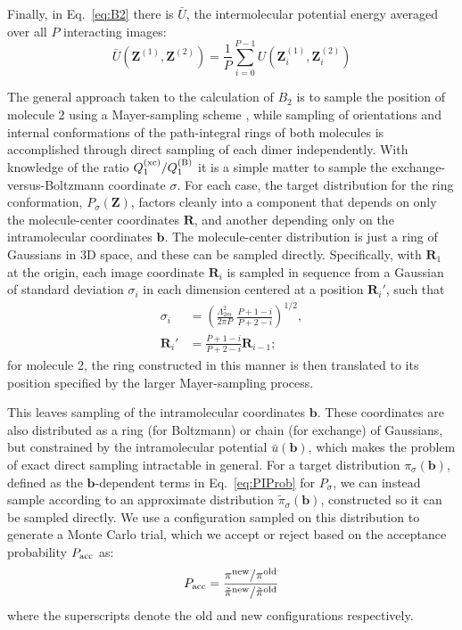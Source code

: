         Finally, in Eq.~\ref{eq:B2} there is $\bar U$, the intermolecular potential energy averaged over all $P$ interacting images:
        \begin{equation}
            \bar U\left( {\mathbf Z}^{(1)}, {\mathbf Z}^{(2)} \right) = \frac{1}{P}\sum\limits_{i = 0}^{P-1} U\left( {\mathbf Z}_i^{(1)},{\mathbf Z}_i^{(2)} \right)
        \end{equation}

        The general approach taken to the calculation of $B_2$ is to sample the position of molecule 2 using a Mayer-sampling scheme \cite{Singh2004}, while sampling of orientations and internal conformations of the path-integral rings of both molecules is accomplished through direct sampling of each dimer independently. With knowledge of the ratio $Q_1^{\rm (xc)}/Q_1^{\rm (B)}$ it is a simple matter to sample the exchange-versus-Boltzmann coordinate $\sigma$. For each case, the target distribution for the ring conformation, $P_\sigma({\mathbf Z})$, factors cleanly into a component that depends on only the molecule-center coordinates ${\mathbf R}$, and another depending only on the intramolecular coordinates ${\mathbf b}$. The molecule-center distribution is just a ring of Gaussians in 3D space, and these can be sampled directly. Specifically, with ${\mathbf R}_1$ at the origin, each image coordinate ${\mathbf R}_i$ is sampled in sequence from a Gaussian of standard deviation $\sigma_i$ in each dimension centered at a position ${\mathbf R}_i'$, such that \cite{Shaul2012}
        \begin{equation}
            \begin{aligned}
                \sigma _i &= \left( \frac{\Lambda _{2m}^2}{2\pi P}\;\frac{P + 1 - i}{P + 2 - i} \right)^{1/2},\\
                {\mathbf R}_i'  &= \frac{P + 1 - i}{P + 2 - i}{{\mathbf R}_{i - 1}};
            \end{aligned}
        \end{equation}
        for molecule 2, the ring constructed in this manner is then translated to its position specified by the larger Mayer-sampling process.

        This leaves sampling of the intramolecular coordinates ${\mathbf b}$. These coordinates are also distributed as a ring (for Boltzmann) or chain (for exchange) of Gaussians, but constrained by the intramolecular potential $\bar u({\mathbf b})$, which makes the problem of exact direct sampling intractable in general. For a target distribution $\pi_\sigma({\mathbf b})$, defined as the ${\mathbf b}$-dependent terms in Eq.~\ref{eq:PIProb} for $P_\sigma$, we can instead sample according to an approximate distribution $\tilde \pi_\sigma({\mathbf b})$, constructed so it can be sampled directly. We use a configuration sampled on this distribution to generate a Monte Carlo trial, which we accept or reject based on the acceptance probability $P_{\rm acc}$ as:
        \begin{equation}
        \label{eq:Pacc}
            P_{\rm acc} = \frac{\pi^{\rm new}/\pi^{\rm old}}{\tilde \pi^{\rm new}/\tilde \pi^{\rm old}}
        \end{equation}
        where the superscripts denote the old and new configurations respectively.

